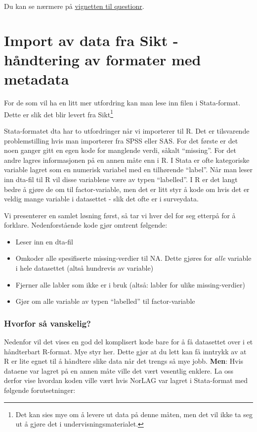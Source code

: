 \documentclass[
  norsk,
  letterpaper,
  DIV=11,
  numbers=noendperiod]{scrreprt}
\providecommand{\tightlist}{%
  \setlength{\itemsep}{0pt}\setlength{\parskip}{0pt}}
\theoremstyle{definition}
\theoremstyle{remark}
\begin{document}
Du kan se nærmere på
\href{https://cran.r-project.org/web/packages/questionr/vignettes/recoding_addins.html}{vignetten
til questionr}.

\chapter{Import av data fra Sikt - håndtering av formater med
metadata}\label{import-av-data-fra-sikt---huxe5ndtering-av-formater-med-metadata}

For de som vil ha en litt mer utfordring kan man lese inn filen i
Stata-format. Dette er slik det blir levert fra Sikt\footnote{Det kan
  sies mye om å levere ut data på denne måten, men det vil ikke ta seg
  ut å gjøre det i undervisningsmaterialet.}

Stata-formatet dta har to utfordringer når vi importerer til R. Det er
tilsvarende problemstilling hvis man importerer fra SPSS eller SAS. For
det første er det noen ganger gitt en egen kode for manglende verdi,
såkalt ``missing''. For det andre lagres informasjonen på en annen måte
enn i R. I Stata er ofte kategoriske variable lagret som en numerisk
variabel med en tilhørende ``label''. Når man leser inn dta-fil til R
vil disse variablene være av typen ``labelled''. I R er det langt bedre
å gjøre de om til factor-variable, men det er litt styr å kode om hvis
det er veldig mange variable i datasettet - slik det ofte er i
surveydata.

Vi presenterer en samlet løsning først, så tar vi hver del for seg
etterpå for å forklare. Nedenforstående kode gjør omtrent følgende:

\begin{itemize}
\tightlist
\item
  Leser inn en dta-fil
\item
  Omkoder alle spesifiserte missing-verdier til NA. Dette gjøres for
  \emph{alle} variable i hele datasettet (altså hundrevis av variable)
\item
  Fjerner alle labler som ikke er i bruk (altså: labler for ulike
  missing-verdier)
\item
  Gjør om alle variable av typen ``labelled'' til factor-variable
\end{itemize}

\subsection{Hvorfor så vanskelig?}\label{hvorfor-suxe5-vanskelig}

Nedenfor vil det vises en god del komplisert kode bare for å få
datasettet over i et håndterbart R-format. Mye styr her. Dette gjør at
du lett kan få inntrykk av at R er lite egnet til å håndtere slike data
når det trengs så mye jobb. \textbf{Men}: Hvis dataene var lagret på en
annen måte ville det vært vesentlig enklere. La oss derfor vise hvordan
koden ville vært hvis NorLAG var lagret i Stata-format med følgende
forutsetninger:
\end{document}
